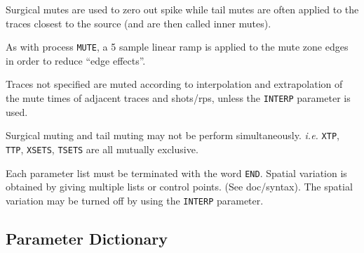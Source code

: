 Surgical mutes are used to zero out spike while tail mutes are often
applied to the traces closest to the source (and are then called
inner mutes).

As with process \texttt{MUTE}, a 5 sample linear ramp is applied to the mute zone
edges in order to reduce ``edge effects''.

Traces not specified are muted according to interpolation and
extrapolation of the mute times of adjacent traces and \glspl{shot}/\glspl{rp}, unless
the \texttt{INTERP} parameter is used.

Surgical muting and tail muting may not be perform simultaneously.  \textit{i.e.}
\texttt{XTP}, \texttt{TTP}, \texttt{XSETS}, \texttt{TSETS} are all mutually exclusive.

Each parameter list must be terminated with the word \texttt{END}.  Spatial
variation is obtained by giving multiple lists or control points.  (See
doc/syntax).  The spatial variation may be turned off by using the
\texttt{INTERP} parameter.


\subsection{Parameter Dictionary}

